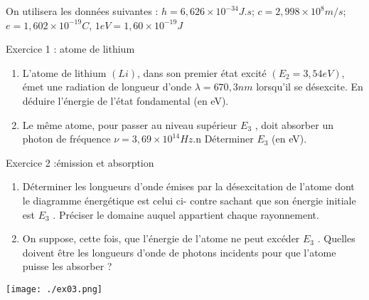 \documentclass[12pt, french]{article}
\begin{document}
\begin{center}

\end{center}
On utilisera les données suivantes :
$h = 6, 626 \times 10^{-34} J.s$; $c = 2, 998 \times 10^8 m/s$; $e = 1, 602 × 10^{-19}C$, $1eV = 1, 60 \times 10^{-19}J$
\vspace{-0.2cm}
   \begin{Box2}{Exercice 1 : atome de lithium}

	   \begin{enumerate}
		   \item  L’atome de lithium $(Li)$, dans son premier état excité $(E_2 = 3, 54eV )$, émet une radiation de longueur d’onde $\lambda = 670, 3nm$ lorsqu’il se désexcite. En déduire l’énergie de l’état fondamental (en eV).

\item Le même atome, pour passer au niveau supérieur $E_3$ , doit absorber un photon de fréquence $\nu = 3, 69 \times 10^{14}Hz$.n Déterminer $E_3$ (en eV).
\end{enumerate}
   \end{Box2}


\begin{Box2}{Exercice 2 :émission et absorption }

	\begin{enumerate}
		\item  Déterminer les longueurs d’onde émises par
la désexcitation de l’atome dont le diagramme
énergétique est celui ci- contre sachant que son
énergie initiale est $E_3$ .
Préciser le domaine auquel appartient chaque
rayonnement.
\item  On suppose, cette fois, que l’énergie de
l’atome ne peut excéder $E_3$ .
Quelles doivent être les longueurs d’onde de
photons incidents pour que l’atome puisse les
absorber ?
\end{enumerate}
  \begin{center}
	\texttt{[image: ./ex03.png]}
  \end{center}



\end{Box2}
\end{document}
